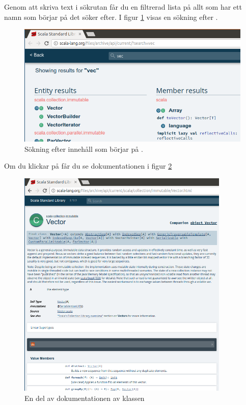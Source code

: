Genom att skriva text i sökrutan får du en filtrerad lista på allt som har ett namn som börjar på det söker efter. I figur \ref{fig:scaladoc:vec} visas en sökning efter .

\begin{figure}[H]
\centering
\includegraphics[width=1.0\textwidth]{../img/scaladoc/scaladoc-vec}

     \caption{ Sökning efter innehåll som börjar på .}
    \label{fig:scaladoc:vec}
\end{figure}

Om du klickar på  får du se dokumentationen i figur  \ref{fig:scaladoc:vector}

\begin{figure}[H]
\centering
\includegraphics[width=0.9\textwidth]{../img/scaladoc/scaladoc-vector}

     \caption{En del av dokumentationen av klassen }
    \label{fig:scaladoc:vector}
\end{figure}

